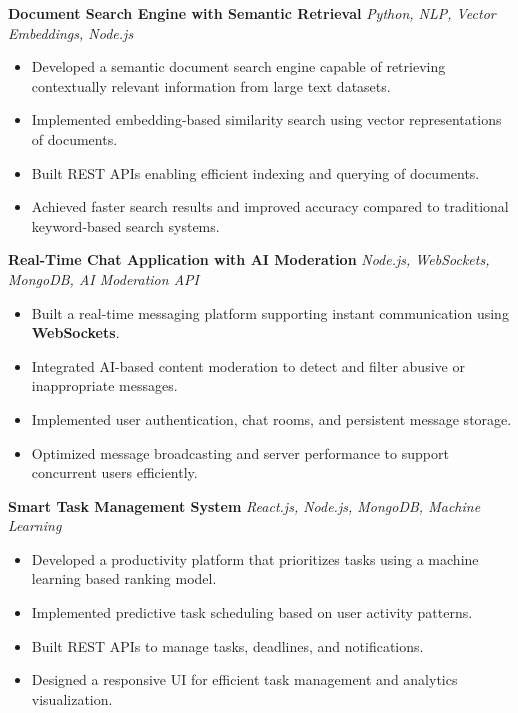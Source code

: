 \documentclass[a4paper,9pt]{article}
\begin{document}
\vspace{3pt}

\textbf{Document Search Engine with Semantic Retrieval}
\hfill \textit{Python, NLP, Vector Embeddings, Node.js}
\begin{itemize}[leftmargin=12pt, itemsep=1pt]
\item Developed a semantic document search engine capable of retrieving contextually relevant information from large text datasets.
\item Implemented embedding-based similarity search using vector representations of documents.
\item Built REST APIs enabling efficient indexing and querying of documents.
\item Achieved faster search results and improved accuracy compared to traditional keyword-based search systems.
\end{itemize}

\vspace{3pt}

\textbf{Real-Time Chat Application with AI Moderation}
\hfill \textit{Node.js, WebSockets, MongoDB, AI Moderation API}
\begin{itemize}[leftmargin=12pt, itemsep=1pt]
\item Built a real-time messaging platform supporting instant communication using \textbf{WebSockets}.
\item Integrated AI-based content moderation to detect and filter abusive or inappropriate messages.
\item Implemented user authentication, chat rooms, and persistent message storage.
\item Optimized message broadcasting and server performance to support concurrent users efficiently.
\end{itemize}

\vspace{3pt}

\textbf{Smart Task Management System}
\hfill \textit{React.js, Node.js, MongoDB, Machine Learning}
\begin{itemize}[leftmargin=12pt, itemsep=1pt]
\item Developed a productivity platform that prioritizes tasks using a machine learning based ranking model.
\item Implemented predictive task scheduling based on user activity patterns.
\item Built REST APIs to manage tasks, deadlines, and notifications.
\item Designed a responsive UI for efficient task management and analytics visualization.
\end{itemize}
\end{document}
